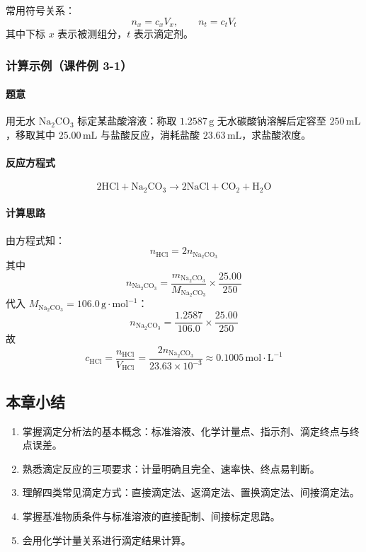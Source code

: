 \documentclass[12pt,a4paper]{article}
\numberwithin{equation}{section}
\newcommand{\summarytitle}{\subsection*{本章小结}}
\begin{document}
常用符号关系：
\begin{equation}
n_x=c_xV_x,\qquad n_t=c_tV_t
\end{equation}
其中下标 $x$ 表示被测组分，$t$ 表示滴定剂。

\subsubsection{计算示例（课件例 3-1）}

\paragraph{题意}
用无水 $\mathrm{Na_2CO_3}$ 标定某盐酸溶液：称取 $1.2587\,\mathrm{g}$ 无水碳酸钠溶解后定容至 $250\,\mathrm{mL}$，移取其中 $25.00\,\mathrm{mL}$ 与盐酸反应，消耗盐酸 $23.63\,\mathrm{mL}$，求盐酸浓度。

\paragraph{反应方程式}
\begin{equation}
2\mathrm{HCl}+\mathrm{Na_2CO_3}\rightarrow 2\mathrm{NaCl}+\mathrm{CO_2}+\mathrm{H_2O}
\end{equation}

\paragraph{计算思路}
由方程式知：
\begin{equation}
n_{\mathrm{HCl}}=2n_{\mathrm{Na_2CO_3}}
\end{equation}
其中
\begin{equation}
n_{\mathrm{Na_2CO_3}}=\frac{m_{\mathrm{Na_2CO_3}}}{M_{\mathrm{Na_2CO_3}}}\times\frac{25.00}{250}
\end{equation}
代入 $M_{\mathrm{Na_2CO_3}}=106.0\,\mathrm{g\cdot mol^{-1}}$：
\begin{equation}
n_{\mathrm{Na_2CO_3}}=\frac{1.2587}{106.0}\times\frac{25.00}{250}
\end{equation}
故
\begin{equation}
c_{\mathrm{HCl}}=\frac{n_{\mathrm{HCl}}}{V_{\mathrm{HCl}}}
=\frac{2n_{\mathrm{Na_2CO_3}}}{23.63\times10^{-3}}
\approx 0.1005\,\mathrm{mol\cdot L^{-1}}
\end{equation}

\summarytitle
\begin{enumerate}
    \item 掌握滴定分析法的基本概念：标准溶液、化学计量点、指示剂、滴定终点与终点误差。
    \item 熟悉滴定反应的三项要求：计量明确且完全、速率快、终点易判断。
    \item 理解四类常见滴定方式：直接滴定法、返滴定法、置换滴定法、间接滴定法。
    \item 掌握基准物质条件与标准溶液的直接配制、间接标定思路。
    \item 会用化学计量关系进行滴定结果计算。
\end{enumerate}
\end{document}
